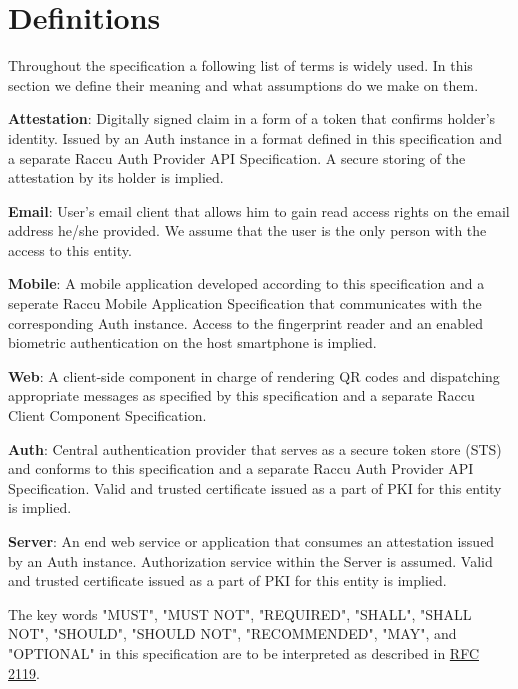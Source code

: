\section{Definitions}
Throughout the specification a following list of terms is widely used. In this section we define their meaning 
and what assumptions do we make on them.

\medskip
\textbf{Attestation}: Digitally signed claim in a form of a token that confirms holder's identity. Issued by 
an Auth instance in a format defined in this specification and a separate Raccu Auth Provider API Specification. 
A secure storing of the attestation by its holder is implied.

\medskip
\textbf{Email}: User's email client that allows him to gain read access rights on the email address he/she 
provided. We assume that the user is the only person with the access to this entity.

\medskip
\textbf{Mobile}: A mobile application developed according to this specification and a seperate Raccu Mobile 
Application Specification that communicates with the corresponding Auth instance. Access to the fingerprint 
reader and an enabled biometric authentication on the host smartphone is implied.

\medskip
\textbf{Web}: A client-side component in charge of rendering QR codes and dispatching appropriate messages 
as specified by this specification and a separate Raccu Client Component Specification.

\medskip
\textbf{Auth}: Central authentication provider that serves as a secure token store (STS) and conforms to 
this specification and a separate Raccu Auth Provider API Specification. Valid and trusted certificate 
issued as a part of PKI for this entity is implied.

\medskip
\textbf{Server}: An end web service or application that consumes an attestation issued by an Auth instance. 
Authorization service within the Server is assumed. Valid and trusted certificate issued as a part of PKI 
for this entity is implied.

\medskip
The key words "MUST", "MUST NOT", "REQUIRED", "SHALL", "SHALL NOT", "SHOULD", "SHOULD NOT", "RECOMMENDED", 
"MAY", and "OPTIONAL" in this specification are to be interpreted as described in 
\href{https://tools.ietf.org/html/rfc2119}{RFC 2119}.